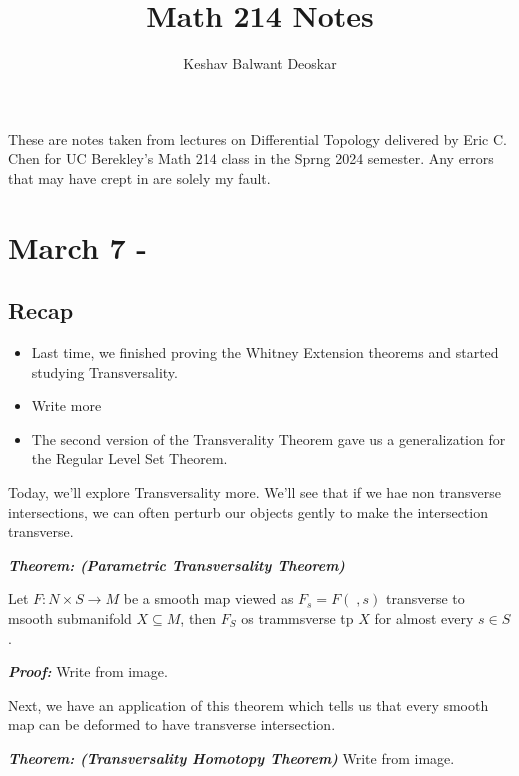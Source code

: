 \documentclass{article}
\title{Math 214 Notes}
\author{Keshav Balwant Deoskar}
\begin{document}
\maketitle

These are notes taken from lectures on Differential Topology delivered by Eric C. Chen for UC Berekley's Math 214 class in the Sprng 2024 semester. Any errors that may have crept in are solely my fault.

\tableofcontents

\pagebreak

\section{March 7 - }
\subsection*{Recap}
\begin{itemize}
  \item Last time, we finished proving the Whitney Extension theorems and started studying Transversality.
  \item Write more
  \item The second version of the Transverality Theorem gave us a generalization for the Regular Level Set Theorem.
\end{itemize}

\vskip 0.5cm
Today, we'll explore Transversality more. We'll see that if we hae non transverse intersections, we can often perturb our objects gently to make the intersection transverse.


\begin{dottedbox}
  \emph{\textbf{Theorem: (Parametric Transversality Theorem)}}

  Let $F : N \times S \rightarrow M$ be a smooth map viewed as $F_s= F(\; ,s)$ transverse to msooth submanifold $X \subseteq M$, then $F_S$ os trammsverse tp $X$ for almost every $s \in S$.
\end{dottedbox}

\vskip 0.5cm
\emph{\textbf{Proof:}} Write from image.


\vskip 1cm
Next, we have an application of this theorem which tells us that every smooth map can be deformed to have transverse intersection.

\vskip 0.5cm
\begin{dottedbox}
  \emph{\textbf{Theorem: (Transversality Homotopy Theorem)}} Write from image.
\end{dottedbox}
\end{document}
